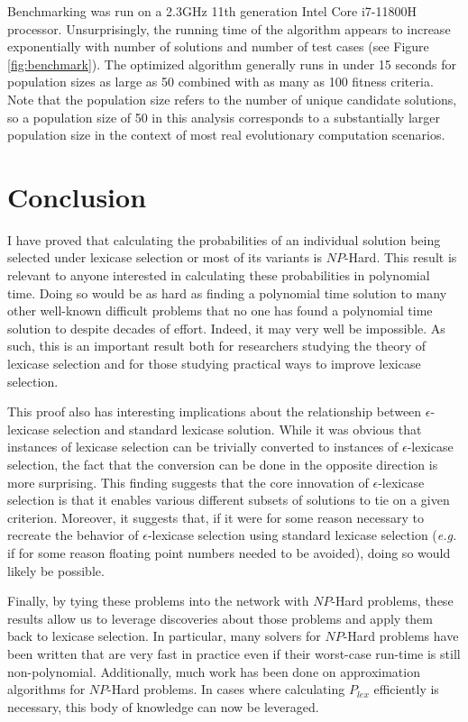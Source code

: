 \documentclass[sigconf]{acmart}
\begin{document}
Benchmarking was run on a 2.3GHz 11th generation Intel Core i7-11800H processor. Unsurprisingly, the running time of the algorithm appears to increase exponentially with number of solutions and number of test cases (see Figure \ref{fig:benchmark}). The optimized algorithm generally runs in under 15 seconds for population sizes as large as 50 combined with as many as 100 fitness criteria. Note that the population size refers to the number of unique candidate solutions, so a population size of 50 in this analysis corresponds to a substantially larger population size in the context of most real evolutionary computation scenarios.

\section{Conclusion}

I have proved that calculating the probabilities of an individual solution being selected under lexicase selection or most of its variants is $NP$-Hard. This result is relevant to anyone interested in calculating these probabilities in polynomial time. Doing so would be as hard as finding a polynomial time solution to many other well-known difficult problems that no one has found a polynomial time solution to despite decades of effort. Indeed, it may very well be impossible. As such, this is an important result both for researchers studying the theory of lexicase selection and for those studying practical ways to improve lexicase selection.

This proof also has interesting implications about the relationship between $\epsilon$-lexicase selection and standard lexicase solution. While it was obvious that instances of lexicase selection can be trivially converted to instances of $\epsilon$-lexicase selection, the fact that the conversion can be done in the opposite direction is more surprising. This finding suggests that the core innovation of  $\epsilon$-lexicase selection is that it enables various different subsets of solutions to tie on a given criterion. Moreover, it suggests that, if it were for some reason necessary to recreate the behavior of $\epsilon$-lexicase selection using standard lexicase selection (\textit{e.g.} if for some reason floating point numbers needed to be avoided), doing so would likely be possible.

Finally, by tying these problems into the network with $NP$-Hard problems, these results allow us to leverage discoveries about those problems and apply them back to lexicase selection. In particular, many solvers for $NP$-Hard problems have been written that are very fast in practice even if their worst-case run-time is still non-polynomial. Additionally, much work has been done on approximation algorithms for $NP$-Hard problems. In cases where calculating $P_{lex}$ efficiently is necessary, this body of knowledge can now be leveraged.
\end{document}
